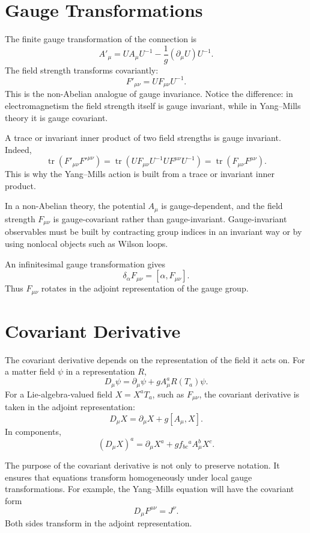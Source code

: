 \section{Gauge Transformations}

The finite gauge transformation of the connection is
\[
    A'_\mu=U A_\mu U^{-1}-\frac{1}{g}(\partial_\mu U)U^{-1}.
\]
The field strength transforms covariantly:
\[
    F'_{\mu\nu}=U F_{\mu\nu} U^{-1}.
\]
This is the non-Abelian analogue of gauge invariance. Notice the difference:
in electromagnetism the field strength itself is gauge invariant, while in
Yang--Mills theory it is gauge covariant.

A trace or invariant inner product of two field strengths is gauge invariant.
Indeed,
\[
    \operatorname{tr}(F'_{\mu\nu}F'^{\mu\nu})
    =\operatorname{tr}(UF_{\mu\nu}U^{-1}UF^{\mu\nu}U^{-1})
    =\operatorname{tr}(F_{\mu\nu}F^{\mu\nu}).
\]
This is why the Yang--Mills action is built from a trace or invariant inner
product.

\begin{remarkbox}
In a non-Abelian theory, the potential \(A_\mu\) is gauge-dependent, and the
field strength \(F_{\mu\nu}\) is gauge-covariant rather than gauge-invariant.
Gauge-invariant observables must be built by contracting group indices in an
invariant way or by using nonlocal objects such as Wilson loops.
\end{remarkbox}

An infinitesimal gauge transformation gives
\[
    \delta_\alpha F_{\mu\nu}=[\alpha,F_{\mu\nu}].
\]
Thus \(F_{\mu\nu}\) rotates in the adjoint representation of the gauge group.

\section{Covariant Derivative}

The covariant derivative depends on the representation of the field it acts on.
For a matter field \(\psi\) in a representation \(R\),
\[
    D_\mu\psi=\partial_\mu\psi+gA_\mu^a R(T_a)\psi.
\]
For a Lie-algebra-valued field \(X=X^aT_a\), such as \(F_{\mu\nu}\), the
covariant derivative is taken in the adjoint representation:
\[
    D_\mu X=\partial_\mu X+g[A_\mu,X].
\]
In components,
\[
    (D_\mu X)^a=\partial_\mu X^a+g f_{bc}{}^a A_\mu^b X^c.
\]

The purpose of the covariant derivative is not only to preserve notation. It
ensures that equations transform homogeneously under local gauge transformations.
For example, the Yang--Mills equation will have the covariant form
\[
    D_\mu F^{\mu\nu}=J^\nu.
\]
Both sides transform in the adjoint representation.

